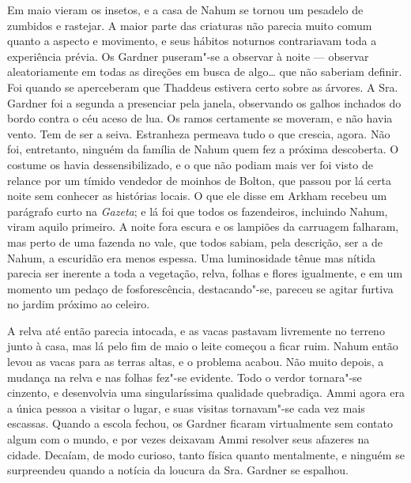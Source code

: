 Em maio vieram os insetos, e a casa de Nahum se tornou um pesadelo de
zumbidos e rastejar. A maior parte das criaturas não parecia muito comum
quanto a aspecto e movimento, e seus hábitos noturnos contrariavam toda
a experiência prévia. Os Gardner puseram"-se a observar à noite ---
observar aleatoriamente em todas as direções em busca de algo\ldots{} que
não saberiam definir. Foi quando se aperceberam que Thaddeus estivera
certo sobre as árvores. A Sra. Gardner foi a segunda a presenciar pela
janela, observando os galhos inchados do bordo contra o céu aceso de
lua. Os ramos certamente se moveram, e não havia vento. Tem de ser a
seiva. Estranheza permeava tudo o que crescia, agora. Não foi,
entretanto, ninguém da família de Nahum quem fez a próxima descoberta. O
costume os havia dessensibilizado, e o que não podiam mais ver foi visto
de relance por um tímido vendedor de moinhos de Bolton, que passou por
lá certa noite sem conhecer as histórias locais. O que ele disse em
Arkham recebeu um parágrafo curto na \textit{Gazeta}; e lá foi que todos
os fazendeiros, incluindo Nahum, viram aquilo primeiro. A noite fora
escura e os lampiões da carruagem falharam, mas perto de uma fazenda no
vale, que todos sabiam, pela descrição, ser a de Nahum, a escuridão era
menos espessa. Uma luminosidade tênue mas nítida parecia ser inerente a
toda a vegetação, relva, folhas e flores igualmente, e em um momento um
pedaço de fosforescência, destacando"-se, pareceu se agitar furtiva no
jardim próximo ao celeiro.

A relva até então parecia intocada, e as vacas pastavam livremente no
terreno junto à casa, mas lá pelo fim de maio o leite começou a ficar
ruim. Nahum então levou as vacas para as terras altas, e o problema
acabou. Não muito depois, a mudança na relva e nas folhas fez"-se
evidente. Todo o verdor tornara"-se cinzento, e desenvolvia uma
singularíssima qualidade quebradiça. Ammi agora era a única pessoa a
visitar o lugar, e suas visitas tornavam"-se cada vez mais escassas.
Quando a escola fechou, os Gardner ficaram virtualmente sem contato
algum com o mundo, e por vezes deixavam Ammi resolver seus afazeres na
cidade. Decaíam, de modo curioso, tanto física quanto mentalmente, e
ninguém se surpreendeu quando a notícia da loucura da Sra. Gardner se
espalhou.

